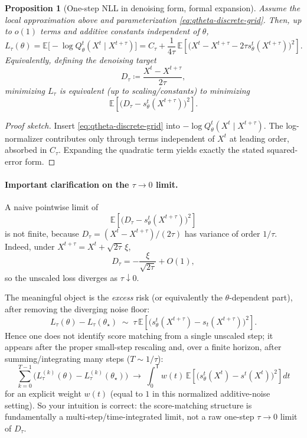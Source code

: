 \documentclass[11pt]{article}
\newtheorem{proposition}{Proposition}
\begin{document}
\begin{proposition}[One-step NLL in denoising form, formal expansion]
Assume the local approximation above and parameterization \eqref{eq:qtheta-discrete-grid}. Then, up to $o(1)$ terms and additive constants independent of $\theta$,
\[
L_\tau(\theta)
=
\mathbb E\!\big[-\log Q_\theta^t(X^t\mid X^{t+\tau})\big]
=
C_\tau+\frac{1}{4\tau}\,
\mathbb E\!\left[\big(X^t-X^{t+\tau}-2\tau s_\theta^t(X^{t+\tau})\big)^2\right].
\]
Equivalently, defining the denoising target
\[
D_\tau\coloneqq \frac{X^t-X^{t+\tau}}{2\tau},
\]
minimizing $L_\tau$ is equivalent (up to scaling/constants) to minimizing
\[
\mathbb E\!\left[\big(D_\tau-s_\theta^t(X^{t+\tau})\big)^2\right].
\]
\end{proposition}
\begin{proof}[Proof sketch]
Insert \eqref{eq:qtheta-discrete-grid} into $-\log Q_\theta^t(X^t\mid X^{t+\tau})$. The log-normalizer contributes only through terms independent of $X^t$ at leading order, absorbed in $C_\tau$. Expanding the quadratic term yields exactly the stated squared-error form.
\end{proof}

\paragraph{Important clarification on the $\tau\to0$ limit.}
A naive pointwise limit of
\[
\mathbb E\!\left[\big(D_\tau-s_\theta^t(X^{t+\tau})\big)^2\right]
\]
is not finite, because $D_\tau=(X^t-X^{t+\tau})/(2\tau)$ has variance of order $1/\tau$.
Indeed, under $X^{t+\tau}=X^t+\sqrt{2\tau}\,\xi$,
\[
D_\tau=-\frac{\xi}{\sqrt{2\tau}}+O(1),
\]
so the unscaled loss diverges as $\tau\downarrow0$.

The meaningful object is the \emph{excess} risk (or equivalently the $\theta$-dependent part), after removing the diverging noise floor:
\[
L_\tau(\theta)-L_\tau(\theta_\star)
\;\sim\;
\tau\,\mathbb E\!\left[\big(s_\theta^t(X^{t+\tau})-s_t(X^{t+\tau})\big)^2\right].
\]
Hence one does not identify score matching from a single unscaled step; it appears after the proper small-step rescaling and, over a finite horizon, after summing/integrating many steps ($T\sim 1/\tau$):
\[
\sum_{k=0}^{T-1}\!\big(L_\tau^{(k)}(\theta)-L_\tau^{(k)}(\theta_\star)\big)
\;\longrightarrow\;
\int_0^{\mathsf T} w(t)\,
\mathbb E\!\left[\big(s_\theta^t(X^t)-s^t(X^t)\big)^2\right]dt
\]
for an explicit weight $w(t)$ (equal to $1$ in this normalized additive-noise setting).
So your intuition is correct: the score-matching structure is fundamentally a multi-step/time-integrated limit, not a raw one-step $\tau\to0$ limit of $D_\tau$.
\end{document}
